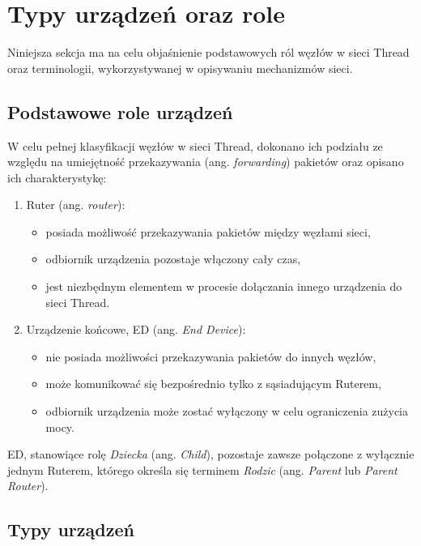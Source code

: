 \section{Typy urządzeń oraz role}
\label{sec:device-types}

    Niniejsza sekcja ma na celu objaśnienie podstawowych ról węzłów w sieci Thread oraz terminologii, wykorzystywanej w opisywaniu mechanizmów sieci.

    \subsection{Podstawowe role urządzeń}

    W celu pełnej klasyfikacji węzłów w sieci Thread, dokonano ich podziału ze względu na umiejętność przekazywania (ang. \textit{forwarding}) pakietów oraz opisano ich charakterystykę:
    \begin{enumerate}
        \item Ruter (ang. \textit{router}):
        \begin{itemize}
            \item posiada możliwość przekazywania pakietów między węzłami sieci,
            \item odbiornik urządzenia pozostaje włączony cały czas,
            \item jest niezbędnym elementem w procesie dołączania innego urządzenia do sieci Thread.
        \end{itemize}
        \item Urządzenie końcowe, ED (ang. \textit{End Device}):
        \begin{itemize}
            \item nie posiada możliwości przekazywania pakietów do innych węzłów,
            \item może komunikować się bezpośrednio tylko z sąsiadującym Ruterem,
            \item odbiornik urządzenia może zostać wyłączony w celu ograniczenia zużycia mocy.
        \end{itemize}
    \end{enumerate}

    ED, stanowiące rolę \textit{Dziecka} (ang. \textit{Child}), pozostaje zawsze połączone z wyłącznie jednym Ruterem, którego określa się terminem \textit{Rodzic} (ang. \textit{Parent} lub \textit{Parent Router}).

    \subsection{Typy urządzeń}
    \label{subsec:device-types}

